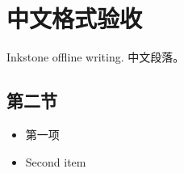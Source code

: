 \documentclass[
]{article}
\author{}
\date{}
\providecommand{\tightlist}{%
  \setlength{\itemsep}{0pt}\setlength{\parskip}{0pt}}
\begin{document}
\hypertarget{ux4e2dux6587ux683cux5f0fux9a8cux6536}{%
\section{中文格式验收}\label{ux4e2dux6587ux683cux5f0fux9a8cux6536}}

Inkstone offline writing. 中文段落。

\hypertarget{ux7b2cux4e8cux8282}{%
\subsection{第二节}\label{ux7b2cux4e8cux8282}}

\begin{itemize}
\tightlist
\item
  第一项
\item
  Second item
\end{itemize}
\end{document}
